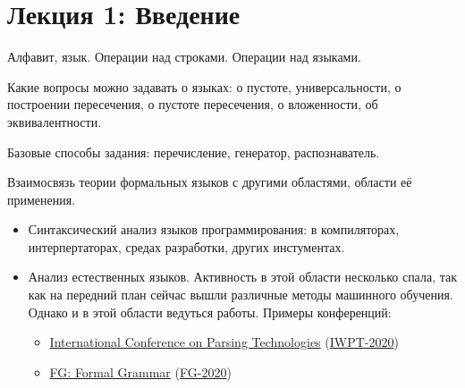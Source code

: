 \section{Лекция 1: Введение}

Алфавит, язык. Операции над строками. Операции над языками.

Какие вопросы можно задавать о языках: о пустоте, универсальности, о построении пересечения, о пустоте пересечения, о вложенности, об эквивалентности.

Базовые способы задания: перечисление, генератор, распознаватель.

Взаимосвязь теории формальных языков с другими областями, области её применения.
\begin{itemize}
  \item Синтаксический анализ языков программирования: в компиляторах, интерпертаторах, средах разработки, других инстументах.
  \item Анализ естественных языков.
  Активность в этой области несколько спала, так как на передний план сейчас вышли различные методы машинного обучения.
  Однако и в этой области ведуться работы.
  Примеры конференций:
  \begin{itemize}
    \item \href{http://www.wikicfp.com/cfp/servlet/event.showcfp?eventid=98626&copyownerid=320}{International Conference on Parsing Technologies} (\href{https://iwpt20.sigparse.org/callforpapers.html}{IWPT-2020})
    \item \href{http://www.wikicfp.com/cfp/program?id=1029&s=FG&f=Formal%20Grammar}{FG: Formal Grammar} (\href{http://fg.phil.hhu.de/2020/}{FG-2020})
  \end{itemize}


\end{itemize}
